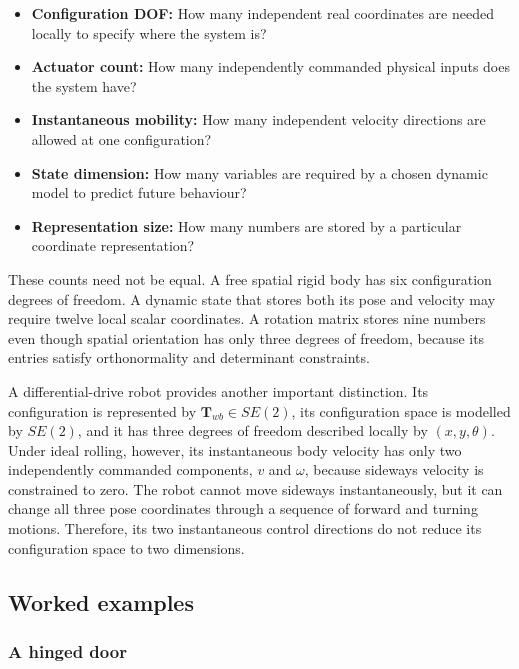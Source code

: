 \documentclass[
  australian,
  12pt,
  letterpaper,
  DIV=11,
  numbers=noendperiod,
  twoside]{scrreprt}
\providecommand{\tightlist}{%
  \setlength{\itemsep}{0pt}\setlength{\parskip}{0pt}}
\begin{document}
\begin{itemize}
\tightlist
\item
  \textbf{Configuration DOF:} How many independent real coordinates are
  needed locally to specify where the system is?
\item
  \textbf{Actuator count:} How many independently commanded physical
  inputs does the system have?
\item
  \textbf{Instantaneous mobility:} How many independent velocity
  directions are allowed at one configuration?
\item
  \textbf{State dimension:} How many variables are required by a chosen
  dynamic model to predict future behaviour?
\item
  \textbf{Representation size:} How many numbers are stored by a
  particular coordinate representation?
\end{itemize}

These counts need not be equal. A free spatial rigid body has six
configuration degrees of freedom. A dynamic state that stores both its
pose and velocity may require twelve local scalar coordinates. A
rotation matrix stores nine numbers even though spatial orientation has
only three degrees of freedom, because its entries satisfy
orthonormality and determinant constraints.

A differential-drive robot provides another important distinction. Its
configuration is represented by \(\mathbf T_{wb}\in SE(2)\), its
configuration space is modelled by \(SE(2)\), and it has three degrees
of freedom described locally by \((x,y,\theta)\). Under ideal rolling,
however, its instantaneous body velocity has only two independently
commanded components, \(v\) and \(\omega\), because sideways velocity is
constrained to zero. The robot cannot move sideways instantaneously, but
it can change all three pose coordinates through a sequence of forward
and turning motions. Therefore, its two instantaneous control directions
do not reduce its configuration space to two dimensions.

\subsection{Worked examples}\label{worked-examples}

\subsubsection{A hinged door}\label{a-hinged-door}
\end{document}
